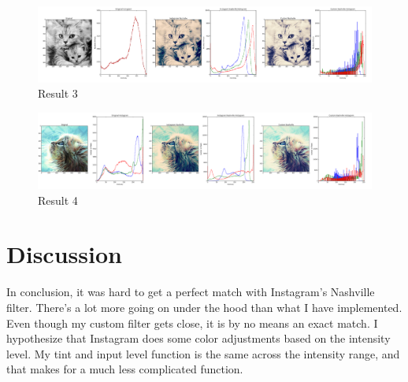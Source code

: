 \documentclass{article}
\begin{document}
\begin{figure}[H]
\includegraphics[width=\linewidth]{result3.png} \caption{Result 3}
\label{fig:result3}
\end{figure}

\begin{figure}[H]
\includegraphics[width=\linewidth]{result4.png} \caption{Result 4}
\label{fig:result4}
\end{figure}

\section{Discussion}
In conclusion, it was hard to get a perfect match with Instagram's Nashville filter. There's a lot more going on under the hood than what I have implemented. Even though my custom filter gets close, it is by no means an exact match. I hypothesize that Instagram does some color adjustments based on the intensity level. My tint and input level function is the same across the intensity range, and that makes for a much less complicated function.

\pagebreak


\end{document}
